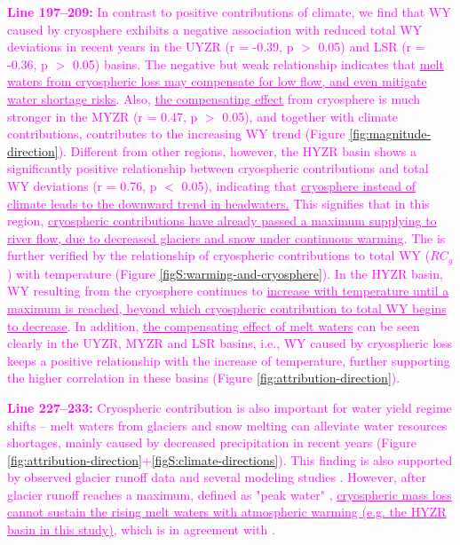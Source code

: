 \documentclass[11pt]{article}
\newcommand{\revised}[3][2]{\bigskip \textcolor{magenta}{\noindent \textbf{Line #2:} #3}}
\begin{document}
\revised{197--209}{In contrast to positive contributions of climate, we find that WY caused by cryosphere exhibits a negative association with reduced total WY deviations in recent years in the UYZR (r = -0.39, p $>$ 0.05) and LSR (r = -0.36, p $>$ 0.05) basins. 
The negative but weak relationship indicates that \ul{melt waters from cryospheric loss may compensate for low flow, and even mitigate water shortage risks}. 
Also, \ul{the compensating effect} from cryosphere is much stronger in the MYZR (r = 0.47, p $>$ 0.05), and together with climate contributions, contributes to the increasing WY trend (Figure \ref{fig:magnitude-direction}). 
Different from other regions, however, the HYZR basin shows a significantly positive relationship between cryospheric contributions and total WY deviations (r = 0.76, p $<$ 0.05), indicating that \ul{cryosphere instead of climate leads to the downward trend in headwaters.}
This signifies that in this region, \ul{cryospheric contributions have already passed a maximum supplying to river flow, due to decreased glaciers and snow under continuous warming}. 
The is further verified by the relationship of cryospheric contributions to total WY ($RC_g$) with temperature (Figure \ref{figS:warming-and-cryosphere}). 
In the HYZR basin, WY resulting from the cryosphere continues to \ul{increase with temperature until a maximum is reached, beyond which cryospheric contribution to total WY begins to decrease}.
In addition, \ul{the compensating effect of melt waters} can be seen clearly in the UYZR, MYZR and LSR basins, i.e., WY caused by cryospheric loss keeps a positive relationship with the increase of temperature, further supporting the higher correlation in these basins (Figure \ref{fig:attribution-direction}).}

\revised{227--233}{Cryospheric contribution is also important for water yield regime shifts -- melt waters from glaciers and snow melting can alleviate water resources shortages, mainly caused by decreased precipitation in recent years (Figure \ref{fig:attribution-direction}+\ref{figS:climate-directions}). This finding is also supported by observed glacier runoff data \citep{yao2010glacial} and several modeling studies \citep{lutz2014consistent, Zhang2020VariationOM, wang2021tp}. However, after glacier runoff reaches a maximum, defined as "peak water" \citep{gleick2010peak}, \ul{cryospheric mass loss cannot sustain the rising melt waters with atmospheric warming (e.g. the HYZR basin in this study)}, which is in agreement with \citet{huss2018global}.}
\end{document}
